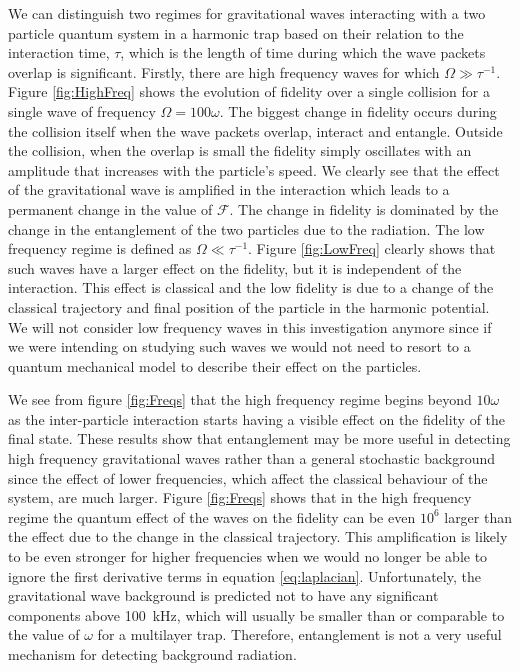 We can distinguish two regimes for gravitational waves interacting
with a two particle quantum system in a harmonic trap based on their
relation to the interaction time, $\tau$, which is the length of time
during which the wave packets overlap is significant. Firstly, there
are high frequency waves for which $\Omega \gg \tau^{-1}$. Figure
\ref{fig:HighFreq} shows the evolution of fidelity over a single
collision for a single wave of frequency $\Omega = 100 \omega$. The
biggest change in fidelity occurs during the collision itself when the
wave packets overlap, interact and entangle. Outside the collision,
when the overlap is small the fidelity simply oscillates with an
amplitude that increases with the particle's speed. We clearly see
that the effect of the gravitational wave is amplified in the
interaction which leads to a permanent change in the value of
$\mathcal{F}$. The change in fidelity is dominated by the change in
the entanglement of the two particles due to the radiation. The low
frequency regime is defined as $\Omega \ll \tau^{-1}$. Figure
\ref{fig:LowFreq} clearly shows that such waves have a larger effect
on the fidelity, but it is independent of the interaction. This effect
is classical and the low fidelity is due to a change of the classical
trajectory and final position of the particle in the harmonic
potential. We will not consider low frequency waves in this
investigation anymore since if we were intending on studying such
waves we would not need to resort to a quantum mechanical model to
describe their effect on the particles.

We see from figure \ref{fig:Freqs} that the high frequency regime
begins beyond $10 \omega$ as the inter-particle interaction starts
having a visible effect on the fidelity of the final state. These
results show that entanglement may be more useful in detecting high
frequency gravitational waves rather than a general stochastic
background since the effect of lower frequencies, which affect the
classical behaviour of the system, are much larger. Figure
\ref{fig:Freqs} shows that in the high frequency regime the quantum
effect of the waves on the fidelity can be even $10^6$ larger than the
effect due to the change in the classical trajectory. This
amplification is likely to be even stronger for higher frequencies
when we would no longer be able to ignore the first derivative terms
in equation \eqref{eq:laplacian}. Unfortunately, the gravitational
wave background is predicted not to have any significant components
above \mbox{100 kHz}, which will usually be smaller than or comparable
to the value of $\omega$ for a multilayer trap. Therefore,
entanglement is not a very useful mechanism for detecting background
radiation.

